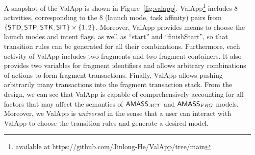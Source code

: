 A snapshot of the ValApp is shown in Figure~\ref{fig:valapp}. 
ValApp\footnote{available at https://github.com/Jinlong-He/ValApp/tree/main} includes 8 activities, corresponding to the $8$ (launch mode, task affinity) pairs from $\{{\sf STD}, {\sf STP}, {\sf STK}, {\sf SIT}\} \times \{1,2\}$. Moreover, ValApp provides means to choose the launch modes and intent flags, as well as ``start'' and ``finishStart'', so that transition rules can be generated for all their combinations. 
Furthermore, each activity of ValApp includes two fragments and two fragment containers. It also provides two variables for fragment identifiers and allows arbitrary combinations of actions to form fragment transactions. Finally, ValApp allows pushing arbitrarily many transactions into the fragment transaction stack. 
%
From the design, we can see that ValApp is capable of comprehensively accounting for all factors that may affect the semantics of $\textsf{AMASS}_{ACT}$ and $\textsf{AMASS}_{FRG}$ models. Moreover, we ValApp is \emph{universal} in the sense that a user can interact with ValApp to choose the transition rules and generate a desired {\AMASS} model. 



